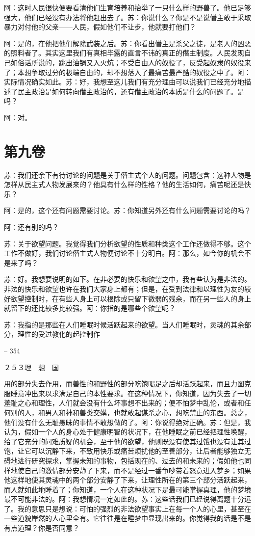 \documentclass[11pt,oneside]{book}
\begin{document}
\begin{common-format}
    阿：这时人民很快便要看清他们生育培养和抬举了一只什么样的野兽了。他已足够强大，他们已经没有办法将他赶出去了。苏：你说什么？你是不是说僭主敢于采取暴力对付他的父亲——人民，假如他们不让步，他就要打他们？

    阿：是的，在他把他们解除武装之后。苏：你看出僭主是杀父之徒，是老人的凶恶的照料者了。其实这里我们有真相毕露的直言不讳的真正的僭主制度。人民发现自己如俗话所说的，跳出油锅又入火炕；不受自由人的奴役了，反受起奴隶的奴役来了；本想争取过分的极端自由的，却不想落入了最痛苦最严酷的奴役之中了。阿：实际情况确实如此。苏：好，我想至这儿我们有充分理由可以说我们已经充分地描述了民主政治是如何转向僭主政治的，还有僭主政治的本质是什么的问题了。是吗？

    阿：对。

    
\chapter{第九卷}
苏：我们还余下有待讨论的问题是关于僭主式个人的问题。问题包含：这种人物是怎样从民主式人物发展来的？他具有什么样的性格？他的生活如何，痛苦呢还是快乐？

    阿：是的，这个还有问题需要讨论。苏：你知道另外还有什么问题需要讨论的吗？

    阿：还有别的吗？

    苏：关于欲望问题。我觉得我们分析欲望的性质和种类这个工作还做得不够。这个工作不做好，我们讨论僭主式人物便讨论不十分明白。阿：那么，如今你的机会不是来了吗？

    苏：好。我想要说明的如下。在非必要的快乐和欲望之中，我有些认为是非法的。非法的快乐和欲望也许在我们大家身上都有；但是，在受到法律和以理性为友的较好欲望控制时，在有些人身上可以根除或只留下微弱的残余，而在另一些人的身上就留下的还比较多比较强。阿：你指的是哪些个欲望呢？

    苏：我指的是那些在人们睡眠时候活跃起来的欲望。当人们睡眠时，灵魂的其余部分，理性的受过教化的起控制作

    

-- 354

    ２５３理　想　国

    用的部分失去作用，而兽性的和野性的部分吃饱喝足之后却活跃起来，而且力图克服睡意冲出来以求满足自己的本性要求。在这种情况下，你知道，因为失去了一切羞耻之心和理性，人们就会没有什么坏事想不出来的；便不怕梦中乱伦，或者和任何别的人，和男人和神和兽类交媾，也就敢起谋杀之心，想吃禁止的东西。总之，他们没有什么无耻愚昧的事情不敢想做的了。阿：你说得绝对正确。苏：但是，我认为，假如一个人的身心处于健康明智的状况下，在他睡眠之前已经把理性唤醒，给了它充分的问难质疑的机会，至于他的欲望，他则既没有使其过饿也没有让其过饱，让它可以沉静下来，不致用快乐或痛苦烦扰他的至善部分，让后者能够独立无碍地进行研究探求，掌握未知的事物，包括现在的、过去的和未来的；假如他也同样地使自己的激情部分安静了下来，而不是经过一番争吵带着怒意进入梦乡；如果他这样地使其灵魂中的两个部分安静了下来，让理性所在的第三个部分活跃起来，而人就如此地睡着了；你知道，一个人在这种状况下是最可能掌握真理，他的梦境最不可能非法的。阿：我想情况一定如此的。苏：这些话我们已经说得离题十分远了。我的意思只是想说：可怕的强烈的非法欲望事实上在每一个人的心里，甚至在一些道貌岸然的人心里全有。它往往是在睡梦中显现出来的。你觉得我的话是不是有点道理？你是否同意？


\end{common-format}
\end{document}
